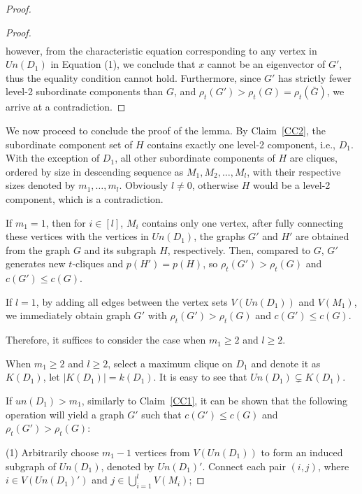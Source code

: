\documentclass[preprint,12pt]{elsarticle}
\begin{document}
\begin{proof}
\begin{proof}
\begin{align*}
			        \end{align*}
                however, from the characteristic equation corresponding to any vertex in ${Un}(D_1)$ in Equation (1), we conclude that $x$ cannot be an eigenvector of $G'$, thus the equality condition cannot hold. Furthermore, since $G'$ has strictly fewer level-2 subordinate components than $G$, and $\rho_t(G') > \rho_t(G) =\rho_t(\bar{G})$, we arrive at a contradiction.

            \end{proof}

            We now proceed to conclude the proof of the lemma. By Claim~\ref{CC2},
            the subordinate component set of $H$ contains exactly one level-2 component, i.e., $D_1$.
            With the exception of $D_1$, all other subordinate components of $H$ are cliques, ordered by size in descending sequence as $M_1, M_2, \ldots, M_l$, with their respective sizes denoted by $m_1, \ldots, m_l$. Obviously $l \neq 0$, otherwise $H$ would be a level-2 component, which is a contradiction.


            If $m_1 = 1$, then for $i \in [l]$, $M_i$ contains only one vertex, after fully connecting these vertices with the vertices in $Un(D_1)$, the graphs $G'$ and $H'$ are obtained from the graph $G$ and its subgraph $H$, respectively. Then, compared to $G$, $G'$ generates new $t$-cliques and $p(H') = p(H)$, so $\rho_t(G') > \rho_t(G)$ and $c(G') \leq c(G)$.

            If $l = 1$, by adding all edges between the vertex sets $V(Un(D_1))$ and $V(M_1)$, we immediately obtain graph $G'$ with $\rho_t(G') > \rho_t(G)$ and $c(G')\leq c(G)$.

            Therefore, it suffices to consider the case when $m_1 \geq 2$ and $l \geq 2$.

            When $m_1 \geq 2$ and $l \geq 2$, select a maximum clique on $D_1$ and denote it as $K(D_1)$, let $|K(D_1)| = k(D_1)$. It is easy to see that $Un(D_1) \subsetneq K(D_1)$.

            If $un(D_1) > m_1$, similarly to Claim~\ref{CC1}, it can be shown that the following operation will yield a graph $G'$ such that $c(G') \leq c(G)$ and $\rho_t(G') > \rho_t(G)$:

            \noindent (1) Arbitrarily choose $m_1 - 1$ vertices from $V(Un(D_1))$ to form an induced subgraph of $Un(D_1)$, denoted by $Un(D_1)'$. Connect each pair $(i, j)$, where $i \in V(Un(D_1)')$ and $j \in \bigcup_{i=1}^l V(M_i)$;


\end{proof}
\end{document}
